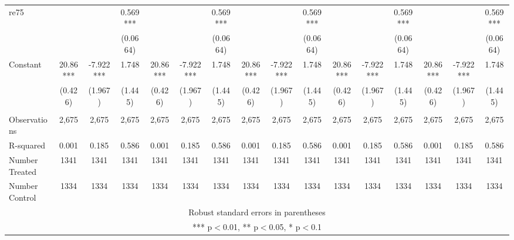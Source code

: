 \documentclass[]{article}
\begin{document}
\begin{tabular}{lccccccccccccccc}
re75 &  &  & 0.569*** &  &  & 0.569*** &  &  & 0.569*** &  &  & 0.569*** &  &  & 0.569*** \\
 &  &  & (0.0664) &  &  & (0.0664) &  &  & (0.0664) &  &  & (0.0664) &  &  & (0.0664) \\
Constant & 20.86*** & -7.922*** & 1.748 & 20.86*** & -7.922*** & 1.748 & 20.86*** & -7.922*** & 1.748 & 20.86*** & -7.922*** & 1.748 & 20.86*** & -7.922*** & 1.748 \\
 & (0.426) & (1.967) & (1.445) & (0.426) & (1.967) & (1.445) & (0.426) & (1.967) & (1.445) & (0.426) & (1.967) & (1.445) & (0.426) & (1.967) & (1.445) \\
 &  &  &  &  &  &  &  &  &  &  &  &  &  &  &  \\
Observations & 2,675 & 2,675 & 2,675 & 2,675 & 2,675 & 2,675 & 2,675 & 2,675 & 2,675 & 2,675 & 2,675 & 2,675 & 2,675 & 2,675 & 2,675 \\
R-squared & 0.001 & 0.185 & 0.586 & 0.001 & 0.185 & 0.586 & 0.001 & 0.185 & 0.586 & 0.001 & 0.185 & 0.586 & 0.001 & 0.185 & 0.586 \\
Number Treated & 1341 & 1341 & 1341 & 1341 & 1341 & 1341 & 1341 & 1341 & 1341 & 1341 & 1341 & 1341 & 1341 & 1341 & 1341 \\
 Number Control & 1334 & 1334 & 1334 & 1334 & 1334 & 1334 & 1334 & 1334 & 1334 & 1334 & 1334 & 1334 & 1334 & 1334 & 1334 \\ \hline
\multicolumn{16}{c}{ Robust standard errors in parentheses} \\
\multicolumn{16}{c}{ *** p$<$0.01, ** p$<$0.05, * p$<$0.1} \\
\end{tabular}
\end{document}
